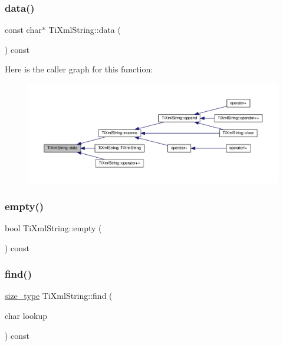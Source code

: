 \subsubsection{\texorpdfstring{data()}{data()}}
{\footnotesize\ttfamily const char$\ast$ Ti\+Xml\+String\+::data (\begin{DoxyParamCaption}{ }\end{DoxyParamCaption}) const\hspace{0.3cm}{\ttfamily [inline]}}

Here is the caller graph for this function\+:
\nopagebreak
\begin{figure}[H]
\begin{center}
\leavevmode
\includegraphics[width=350pt]{class_ti_xml_string_a0e010e1737cfc3ee885b42875171b88e_icgraph}
\end{center}
\end{figure}
\mbox{\label{class_ti_xml_string_a3139aafb0f0a8e26d1a4ed58a50f3678}} 
\subsubsection{\texorpdfstring{empty()}{empty()}}
{\footnotesize\ttfamily bool Ti\+Xml\+String\+::empty (\begin{DoxyParamCaption}{ }\end{DoxyParamCaption}) const\hspace{0.3cm}{\ttfamily [inline]}}

\mbox{\label{class_ti_xml_string_a22fc54a23c5a0ab771331a25a769516e}} 
\subsubsection{\texorpdfstring{find()}{find()}\hspace{0.1cm}{\footnotesize\ttfamily [1/2]}}
{\footnotesize\ttfamily \hyperlink{class_ti_xml_string_abeb2c1893a04c17904f7c06546d0b971}{size\+\_\+type} Ti\+Xml\+String\+::find (\begin{DoxyParamCaption}\item[{char}]{lookup }\end{DoxyParamCaption}) const\hspace{0.3cm}{\ttfamily [inline]}}

